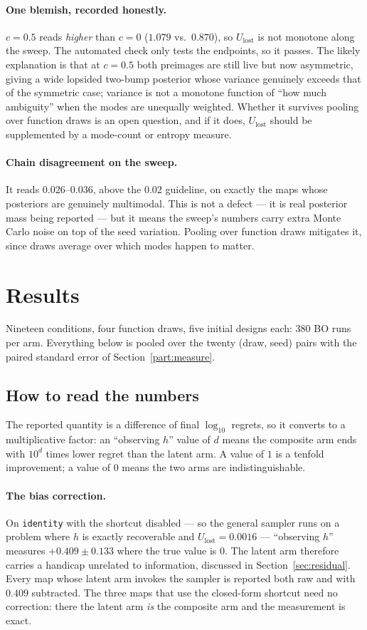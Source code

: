 \documentclass[11pt]{article}
\newcommand{\Ulost}{U_{\text{lost}}}
\begin{document}
\paragraph{One blemish, recorded honestly.} $c=0.5$ reads \emph{higher} than
$c=0$ ($1.079$ vs.\ $0.870$), so $\Ulost$ is not monotone along the sweep. The
automated check only tests the endpoints, so it passes. The likely explanation is
that at $c=0.5$ both preimages are still live but now asymmetric, giving a wide
lopsided two-bump posterior whose variance genuinely exceeds that of the
symmetric case; variance is not a monotone function of ``how much ambiguity''
when the modes are unequally weighted. Whether it survives pooling over function
draws is an open question, and if it does, $\Ulost$ should be supplemented by a
mode-count or entropy measure.

\paragraph{Chain disagreement on the sweep.} It reads $0.026$--$0.036$, above the
$0.02$ guideline, on exactly the maps whose posteriors are genuinely multimodal.
This is not a defect --- it is real posterior mass being reported --- but it means
the sweep's numbers carry extra Monte Carlo noise on top of the seed variation.
Pooling over function draws mitigates it, since draws average over which modes
happen to matter.

\section{Results}
\label{sec:results}

Nineteen conditions, four function draws, five initial designs each: $380$ BO
runs per arm. Everything below is pooled over the twenty (draw, seed) pairs with
the paired standard error of Section~\ref{part:measure}.

\subsection{How to read the numbers}

The reported quantity is a difference of final $\log_{10}$ regrets, so it
converts to a multiplicative factor: an ``observing $h$'' value of $d$ means the
composite arm ends with $10^{d}$ times lower regret than the latent arm. A value
of $1$ is a tenfold improvement; a value of $0$ means the two arms are
indistinguishable.

\paragraph{The bias correction.} On \texttt{identity} with the shortcut
disabled --- so the general sampler runs on a problem where $h$ is exactly
recoverable and $\Ulost=0.0016$ --- ``observing $h$'' measures
$+0.409\pm0.133$ where the true value is $0$. The latent arm therefore carries a
handicap unrelated to information, discussed in
Section~\ref{sec:residual}. Every map whose latent arm invokes the sampler is
reported both raw and with $0.409$ subtracted. The three maps that use the
closed-form shortcut need no correction: there the latent arm \emph{is} the
composite arm and the measurement is exact.
\end{document}
